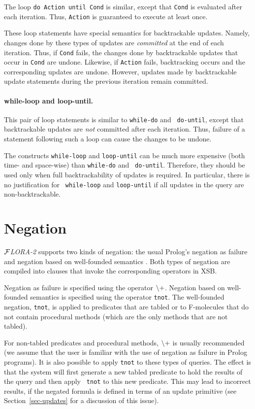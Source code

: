 \documentclass[11pt]{article}
\newcommand{\FLORA}{{\mbox{${\cal F}${\small\it LORA}\rm\emph{-2}}}\xspace}
\newcommand{\NAF}{{$\tt\backslash +$}\xspace}
\begin{document}
The loop {\tt do Action until Cond} is similar, except that {\tt Cond} is
evaluated after each iteration. Thus, {\tt Action} is guaranteed to execute
at least once.

These loop statements have special semantics for backtrackable updates.
Namely, changes done by these types of updates are \emph{committed} at the
end of each iteration. Thus, if {\tt Cond} fails, the changes done by
backtrackable updates that occur in {\tt Cond} are undone. Likewise, if
{\tt Action} fails, backtracking occurs and the corresponding updates are
undone. However, updates made by backtrackable update statements during the
previous iteration remain committed.


\paragraph{while-loop and loop-until.}
This pair of loop statements is similar to {\tt while-do} and {\tt
  do-until}, except that backtrackable updates are \emph{not} committed
after each iteration. Thus, failure of a statement following such a loop
can cause the changes to be undone.

The constructs {\tt while-loop} and {\tt loop-until} can be much more
expensive (both time- and space-wise) than {\tt while-do} and {\tt
  do-until}. Therefore, they should be used only when full backtrackability
of updates is required. In particular, there is no justification for {\tt
  while-loop} and {\tt loop-until} if all updates in the query are
non-backtrackable.


\section{Negation} \label{sec:negation}


\FLORA supports two kinds of negation: the usual Prolog's
negation as failure \cite{Cla78} and negation based on well-founded
semantics \cite{gelder-alternating-89,gelder-ross-schlipf-91}. Both types
of negation are compiled into clauses that invoke the corresponding
operators in XSB.

Negation as failure is specified using the operator \NAF.  Negation based
on well-founded semantics is specified using the operator {\tt tnot}. The
well-founded negation, {\tt tnot}, is applied to predicates that are tabled
or to F-molecules that do not contain procedural methods (which are the
only methods that are not tabled).

For non-tabled predicates and procedural methods, \NAF is usually
recommended (we assume that the user is familiar with the use of negation
as failure in Prolog programs).  It is also possible to apply {\tt tnot} to
these types of queries.  The effect is that the system will first generate
a new tabled predicate to hold the results of the query and then apply {\tt
  tnot} to this new predicate. This may lead to incorrect results,
if the negated formula is defined in terms of an update
primitive (see Section~\ref{sec-updates} for a discussion of this issue).
\end{document}
